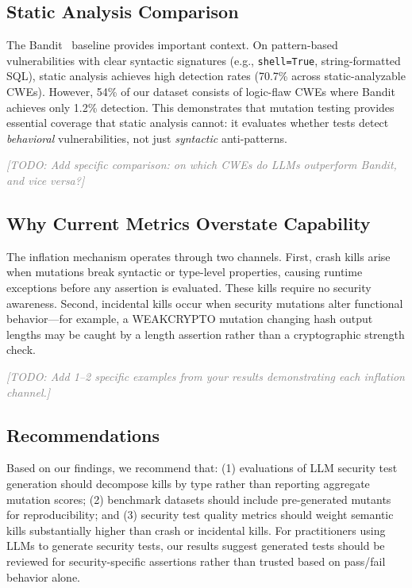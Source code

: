 \documentclass[sigconf,review,anonymous]{acmart}
\newcommand{\todo}[1]{\textcolor{gray}{\textit{[TODO: #1]}}}
\begin{document}
\subsection{Static Analysis Comparison}

The Bandit~\cite{bandit2024} baseline provides important context. On pattern-based vulnerabilities with clear syntactic signatures (e.g., \texttt{shell=True}, string-formatted SQL), static analysis achieves high detection rates (70.7\% across static-analyzable CWEs). However, 54\% of our dataset consists of logic-flaw CWEs where Bandit achieves only 1.2\% detection. This demonstrates that mutation testing provides essential coverage that static analysis cannot: it evaluates whether tests detect \emph{behavioral} vulnerabilities, not just \emph{syntactic} anti-patterns.

\todo{Add specific comparison: on which CWEs do LLMs outperform Bandit, and vice versa?}


\subsection{Why Current Metrics Overstate Capability}

The inflation mechanism operates through two channels. First, crash kills arise when mutations break syntactic or type-level properties, causing runtime exceptions before any assertion is evaluated. These kills require no security awareness. Second, incidental kills occur when security mutations alter functional behavior---for example, a \textsc{WEAKCRYPTO} mutation changing hash output lengths may be caught by a length assertion rather than a cryptographic strength check.

\todo{Add 1--2 specific examples from your results demonstrating each inflation channel.}


\subsection{Recommendations}

Based on our findings, we recommend that: (1) evaluations of LLM security test generation should decompose kills by type rather than reporting aggregate mutation scores; (2) benchmark datasets should include pre-generated mutants for reproducibility; and (3) security test quality metrics should weight semantic kills substantially higher than crash or incidental kills. For practitioners using LLMs to generate security tests, our results suggest generated tests should be reviewed for security-specific assertions rather than trusted based on pass/fail behavior alone.
\end{document}
